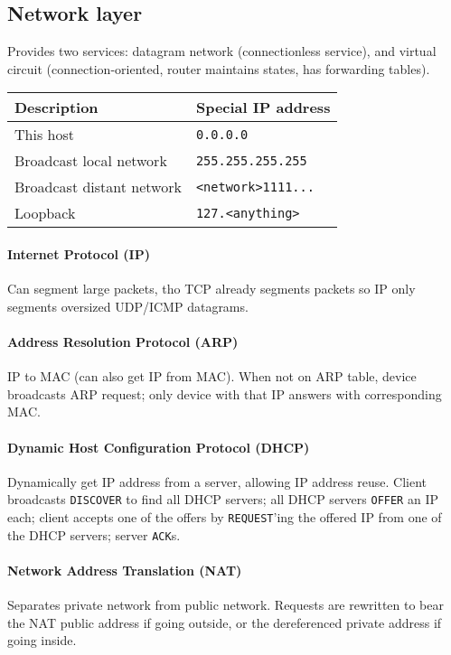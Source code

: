\documentclass{form}
\begin{document}
\begin{multicols}{3}
    \section*{Network layer}
    Provides two services: datagram network (connectionless service), and virtual circuit (connection-oriented, router maintains states, has forwarding tables).

    \begin{tabular}{@{}l | l@{}}
        \textbf{Description} & \textbf{Special IP address} \\ \hline
        This host                 & \texttt{0.0.0.0} \\
        Broadcast local network   & \texttt{255.255.255.255} \\
        Broadcast distant network & \texttt{<network>1111...} \\
        Loopback                  & \texttt{127.<anything>}
    \end{tabular}

    \paragraph{Internet Protocol (IP)}
    Can segment large packets, tho TCP already segments packets so IP only segments oversized UDP/ICMP datagrams.

    \paragraph{Address Resolution Protocol (ARP)}
    IP to MAC (can also get IP from MAC). When not on ARP table, device broadcasts ARP request; only device with that IP answers with corresponding MAC.

    \paragraph{Dynamic Host Configuration Protocol (DHCP)}
    Dynamically get IP address from a server, allowing IP address reuse. Client broadcasts \texttt{DISCOVER} to find all DHCP servers; all DHCP servers \texttt{OFFER} an IP each; client accepts one of the offers by \texttt{REQUEST}'ing the offered IP from one of the DHCP servers; server \texttt{ACK}s.

    \paragraph{Network Address Translation (NAT)}
    Separates private network from public network. Requests are rewritten to bear the NAT public address if going outside, or the dereferenced private address if going inside.


\end{multicols}
\end{document}

